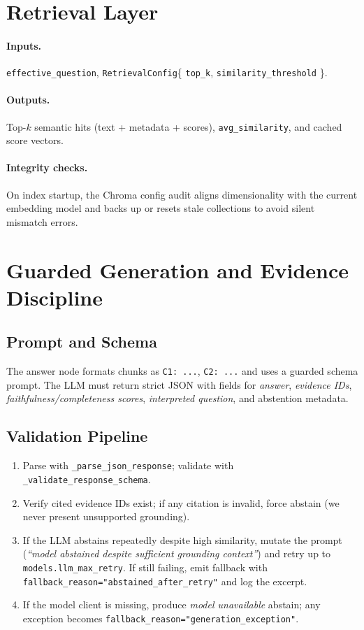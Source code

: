 \documentclass[11pt]{article}
\begin{document}
\section{Retrieval Layer}
\paragraph{Inputs.} \texttt{effective\_question}, \texttt{RetrievalConfig}\{ \texttt{top\_k}, \texttt{similarity\_threshold} \}.

\paragraph{Outputs.} Top-$k$ semantic hits (text + metadata + scores), \texttt{avg\_similarity}, and cached score vectors.
\paragraph{Integrity checks.} On index startup, the Chroma config audit aligns dimensionality with the current embedding model and backs up or resets stale collections to avoid silent mismatch errors.

\section{Guarded Generation and Evidence Discipline}
\subsection{Prompt and Schema}
The answer node formats chunks as \texttt{C1: ...}, \texttt{C2: ...} and uses a guarded schema prompt. The LLM must return strict JSON with fields for \emph{answer}, \emph{evidence IDs}, \emph{faithfulness/completeness scores}, \emph{interpreted question}, and abstention metadata.

\subsection{Validation Pipeline}
\begin{enumerate}[leftmargin=1.25em]
  \item Parse with \texttt{\_parse\_json\_response}; validate with \texttt{\_validate\_response\_schema}.
  \item Verify cited evidence IDs exist; if any citation is invalid, force abstain (we never present unsupported grounding).
  \item If the LLM abstains repeatedly despite high similarity, mutate the prompt (\emph{``model abstained despite sufficient grounding context''}) and retry up to \texttt{models.llm\_max\_retry}. If still failing, emit fallback with \texttt{fallback\_reason="abstained\_after\_retry"} and log the excerpt.
  \item If the model client is missing, produce \emph{model unavailable} abstain; any exception becomes \texttt{fallback\_reason="generation\_exception"}.
\end{enumerate}
\end{document}
